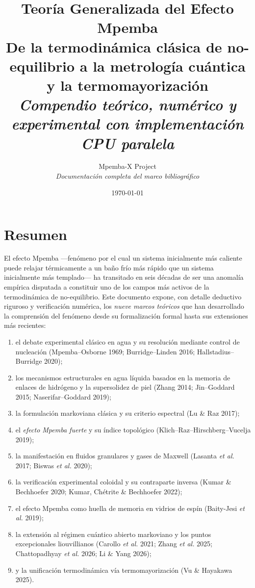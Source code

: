 \documentclass[11pt,a4paper,twoside]{report}
\title{
    {\Huge\bfseries Teoría Generalizada del Efecto Mpemba}\\[0.5cm]
    {\Large De la termodinámica clásica de no-equilibrio a la metrología cuántica y la termomayorización}\\[0.3cm]
    {\large \textit{Compendio teórico, numérico y experimental con implementación CPU paralela}}
}
\author{Mpemba-X Project \\
    \textit{Documentación completa del marco bibliográfico}}
\date{\today}
\theoremstyle{definition}
\theoremstyle{remark}
\begin{document}
\frontmatter
\pagestyle{empty}
\maketitle
\cleardoublepage

\thispagestyle{empty}
\section*{Resumen}

El efecto Mpemba ---fenómeno por el cual un sistema inicialmente más caliente puede 
relajar térmicamente a un baño frío más rápido que un sistema inicialmente más 
templado--- ha transitado en seis décadas de ser una anomalía empírica disputada a 
constituir uno de los campos más activos de la termodinámica de no-equilibrio. Este 
documento expone, con detalle deductivo riguroso y verificación numérica, los 
\emph{nueve marcos teóricos} que han desarrollado la comprensión del fenómeno desde su 
formalización formal hasta sus extensiones más recientes:

\begin{enumerate}
\item el debate experimental clásico en agua y su resolución mediante control de 
nucleación (Mpemba--Osborne 1969; Burridge--Linden 2016; Hallstadius--Burridge 2020);
\item los mecanismos estructurales en agua líquida basados en la memoria de enlaces 
de hidrógeno y la supersolidez de piel (Zhang 2014; Jin--Goddard 2015; Naserifar--Goddard 2019);
\item la formulación markoviana clásica y su criterio espectral 
(Lu \& Raz 2017);
\item el \emph{efecto Mpemba fuerte} y su índice topológico (Klich--Raz--Hirschberg--Vucelja 2019);
\item la manifestación en fluidos granulares y gases de Maxwell 
(Lasanta \emph{et al.} 2017; Biswas \emph{et al.} 2020);
\item la verificación experimental coloidal y su contraparte inversa 
(Kumar \& Bechhoefer 2020; Kumar, Chétrite \& Bechhoefer 2022);
\item el efecto Mpemba como huella de memoria en vidrios de espín 
(Baity-Jesi \emph{et al.} 2019);
\item la extensión al régimen cuántico abierto markoviano y los puntos excepcionales 
liouvillianos (Carollo \emph{et al.} 2021; Zhang \emph{et al.} 2025; 
Chattopadhyay \emph{et al.} 2026; Li \& Yang 2026);
\item y la unificación termodinámica vía termomayorización 
(Vu \& Hayakawa 2025).
\end{enumerate}
\end{document}
